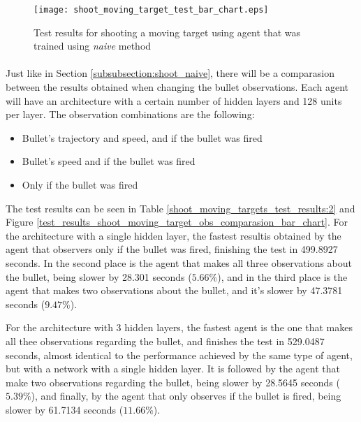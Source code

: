 \begin{figure}
    \begin{center}
        \texttt{[image: shoot\_moving\_target\_test\_bar\_chart.eps]}
        \caption{Test results for shooting a moving target using agent that was trained using \emph{naive} method}
        \label{test_results_shoot_moving_target_bar_chart}
    \end{center}
\end{figure}



\paragraph{}
Just like in Section \ref{subsubsection:shoot_naive}, there will be a comparasion between the results obtained when changing the bullet observations. Each agent will have an architecture with a certain number of hidden layers and 128 units per layer. The observation combinations are the following:
\begin{itemize}
    \item Bullet's trajectory and speed, and if the bullet was fired
    \item Bullet's speed and if the bullet was fired
    \item Only if the bullet was fired
\end{itemize}

The test results can be seen in Table \ref{shoot_moving_targets_test_results:2} and Figure \ref{test_results_shoot_moving_target_obs_comparasion_bar_chart}. For the architecture with a single hidden layer, the fastest resultis obtained by the agent that observers only if the bullet was fired, finishing the test in 499.8927 seconds. In the second place is the agent that makes all three observations about the bullet, being slower by 28.301 seconds ($5.66\%$), and in the third place is the agent that makes two observations about the bullet, and it's slower by 47.3781 seconds ($9.47\%$).

For the architecture with 3 hidden layers, the fastest agent is the one that makes all thee observations regarding the bullet, and finishes the test in 529.0487 seconds, almost identical to the performance achieved by the same type of agent, but with a network with a single hidden layer. It is followed by the agent that make two observations regarding the bullet, being slower by 28.5645 seconds ($5.39\%$), and finally, by the agent that only observes if the bullet is fired, being slower by 61.7134 seconds ($11.66\%$).

